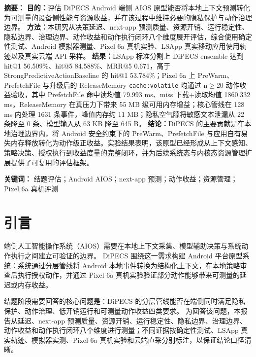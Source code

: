 \documentclass[12pt,a4paper]{article}
\begin{document}
\makecover
\clearpage
{}

{\hypersetup{linkcolor=black}\tableofcontents}
\newpage

\begin{dipecsabstract}
\noindent\textbf{ 摘要：}
\textbf{目的：}评估 DiPECS Android 端侧 AIOS 原型能否将本地上下文预测转化为可测量的设备侧性能与资源收益，并在该过程中维持必要的隐私保护与动作治理边界。
\textbf{方法：}本研究从决策延迟、next-app 预测质量、资源开销、运行稳定性、隐私边界、治理边界、动作收益和动作执行闭环八个维度展开评估，综合使用确定性测试、Android 模拟器测量、Pixel 6a 真机实验、LSApp 真实移动应用使用轨迹以及真实云端 API 采样。
\textbf{结果：}LSApp 标准分割上 DiPECS ensemble 达到 hit@1 56.509\%、hit@5 84.588\%、MRR@5 0.671，高于 StrongPredictiveActionBaseline 的 hit@1 53.784\%；Pixel 6a 上 PreWarm、PrefetchFile 与升级后的 ReleaseMemory \texttt{cache:volatile} 均通过 n$\ge$20 动作收益验收，其中 PrefetchFile 命中读均值 79.993 ms、miss 下载+读取均值 1860.332 ms，ReleaseMemory 在真压力下带来 55 MB 级可用内存增益；核心管线在 128 ms 内处理 1631 条事件，峰值内存约 11 MB；隐私空气隙将敏感文本泄漏从 22 条降至 0 条、模型输入从 63 KB 降至 645 B。
\textbf{结论：}DiPECS 的主要贡献是在本地治理边界内，将 Android 安全约束下的 PreWarm、PrefetchFile 与应用自有易失内存释放转化为动作级正收益。实验结果表明，该原型已经形成从上下文感知、策略决策、授权执行到收益度量的完整闭环，并为后续系统态与内核态资源管理扩展提供了可复用的评估框架。

\vspace{0.5em}
\noindent\textbf{ 关键词：} 结题评估；Android AIOS；next-app 预测；动作收益；资源管理；Pixel 6a 真机评测
\end{dipecsabstract}

\section{引言}\label{sec:intro}

端侧人工智能操作系统（AIOS）需要在本地上下文采集、模型辅助决策与系统动作执行之间建立可验证的边界。
DiPECS 围绕这一需求构建 Android 平台原型系统：系统通过分层管线将 Android 本地事件转换为结构化上下文，在本地策略审查后执行授权动作，并通过 Pixel 6a 真机实验验证部分动作能够带来可测量的延迟或内存收益。

结题阶段需要回答的核心问题是：DiPECS 的分层管线能否在端侧同时满足隐私保护、动作治理、低开销运行和可测量动作收益四类要求。
为回答该问题，本报告从延迟、next-app 预测质量、资源开销、运行稳定性、隐私边界、治理边界、动作收益和动作执行闭环八个维度进行测量；不同证据按确定性测试、LSApp 真实轨迹、模拟器实测、Pixel 6a 真机实验和云端直采分别标注，以保证结论口径清晰。
\end{document}
